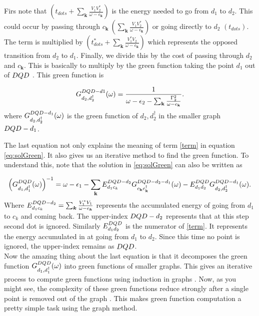 Firs note that $\left(t_{dots}+\sum_{\mathbf{k}}\frac{V_{1}V_{2}^{*}}{\omega-\epsilon_{\mathbf{k}}}\right)$ is the energy needed to go from $d_{1}$ to $d_{2}$. This could occur by passing through $c_{\boldsymbol{k}} \ \left(\sum_{\mathbf{k}}\frac{V_{1}V_{2}^{*}}{\omega-\epsilon_{\mathbf{k}}}\right)$ or going directly to $d_ 2$ $\left(t_{dots}\right)$. The term is multiplied by $\left(t_{dots}^{*}+\sum_{\mathbf{k}}\frac{V_{1}^{*}V_{2}}{\omega-\epsilon_{\mathbf{k}}}\right)$ which represents the opposed transition from $d_{2}$ to $d_{1}$.  Finally, we  divide this by the cost of passing through $d_{2}$ and $c_{\boldsymbol{k}}$. This is basically to multiply by the green function taking the point $d_{1}$ out of $DQD$ . This green function is


\begin{equation}
    G_{d_2,d_2^\dagger}^{ DQD-d1} (\omega)= \frac{1}{\omega-\epsilon_{2}-\sum_{\mathbf{k}}\frac{\Gamma_{2}^{2}}{\omega-\epsilon_{\mathbf{k}}}}.
\end{equation}
where $G_{d_2,d_2^\dagger}^{ DQD-d_1} (\omega)$ is the green function of $d_2,d_2^\dagger$ in the smaller graph $DQD-d_1$. 

The last equation not only explains the meaning of term \eqref{term} in equation \eqref{eq:solGreen}. It also gives us an iterative method to find the green function. To understand this, note that the solution in \eqref{eq:solGreen} can also be written as 

\begin{equation}
\left( G_{d_{1},d_{1}^{\dagger}}^{ DQD} (\omega) \right) ^{-1}= \omega - \epsilon_1- \sum_\textbf{k} E_{d_1c_k}^{DQD-d_2} G_{c_\textbf{k}c^\dagger_\textbf{k}}^{ DQD-d_2-d_1} (\omega)  - E_{d_1d_2}^{DQD} G_{d_2,d_2^\dagger}^{ DQD-d_1} (\omega) . \label{eq:solGreen2}
\end{equation}
Where $E_{d_1c_k}^{DQD-d_2} = \sum_{\boldsymbol{k}}\frac{V_{1}^{*}V_{1}}{\omega-\epsilon_{\boldsymbol{k}}} $  represents the accumulated energy of going from $d_1$ to $c_k$ and coming back. The upper-index $DQD-d_2$ represents that at this step second dot is ignored. Similarly $E_{d_1d_2}^{DQD}$ is the numerator of \eqref{term}. It represents the energy accumulated in at going from $d_1$ to $d_2$. Since this time no point is ignored, the upper-index remains as $DQD$. \\

Now the amazing thing about the last equation is that it decomposes the green function $G_{d_{1},d_{1}^{\dagger}}^{ DQD} (\omega)$  into green functions of smaller graphs. This gives an iterative process to compute green functions using induction in graphs .  Now, as you might see, the complexity of these green functions reduce strongly after a single point is removed out of the graph . This makes green function computation a pretty simple task using the graph method. 

